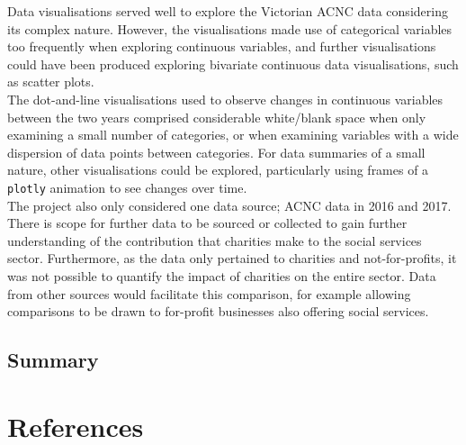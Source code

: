 \documentclass[
  11pt,
]{article}
\begin{document}
Data visualisations served well to explore the Victorian ACNC data considering its complex nature. However, the visualisations made use of categorical variables too frequently when exploring continuous variables, and further visualisations could have been produced exploring bivariate continuous data visualisations, such as scatter plots.\\
The dot-and-line visualisations used to observe changes in continuous variables between the two years comprised considerable white/blank space when only examining a small number of categories, or when examining variables with a wide dispersion of data points between categories. For data summaries of a small nature, other visualisations could be explored, particularly using frames of a \texttt{plotly} animation to see changes over time.\\
The project also only considered one data source; ACNC data in 2016 and 2017. There is scope for further data to be sourced or collected to gain further understanding of the contribution that charities make to the social services sector. Furthermore, as the data only pertained to charities and not-for-profits, it was not possible to quantify the impact of charities on the entire sector. Data from other sources would facilitate this comparison, for example allowing comparisons to be drawn to for-profit businesses also offering social services.

\hypertarget{summary}{%
\subsection{Summary}\label{summary}}

\newpage
{}
\onecolumn

\hypertarget{references}{%
\section{References}\label{references}}

\fontsize{11}{14}
\end{document}
